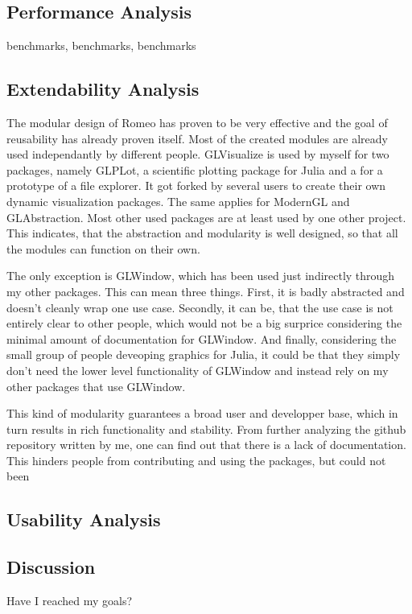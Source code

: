 \subsection{Performance Analysis}
benchmarks, benchmarks, benchmarks
\subsection{Extendability Analysis}
The modular design of Romeo has proven to be very effective and the goal of reusability has already proven itself.
Most of the created modules are already used independantly by different people.
GLVisualize is used by myself for two packages, namely GLPLot, a scientific plotting package for Julia and a for a prototype of a file explorer. 
It got forked by several users to create their own dynamic visualization packages.
The same applies for ModernGL and GLAbstraction. Most other used packages are at least used by one other project.
This indicates, that the abstraction and modularity is well designed, so that all the modules can function on their own.

The only exception is GLWindow, which has been used just indirectly through my other packages. 
This can mean three things.
First, it is badly abstracted and doesn't cleanly wrap one use case.
Secondly, it can be, that the use case is not entirely clear to other people, which would not be a big surprice considering the minimal amount of documentation for GLWindow.
And finally, considering the small group of people deveoping graphics for Julia, it could be that they simply don't need the lower level functionality of GLWindow and instead rely on my other packages that use GLWindow.

This kind of modularity guarantees a broad user and developper base, which in turn results in rich functionality and stability.
From further analyzing the github repository written by me, one can find out that there is a lack of documentation.
This hinders people from contributing and using the packages, but could not been 
\subsection{Usability Analysis}



\subsection{Discussion}
Have I reached my goals?
